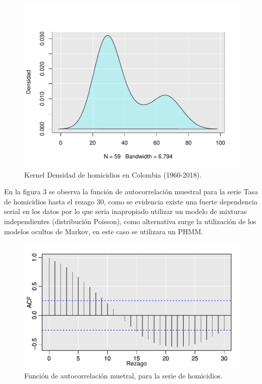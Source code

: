 \documentclass[a4paper]{article}\usepackage[]{graphicx}\usepackage[]{color}
\makeatletter
\def\maxwidth{ %
  \ifdim\Gin@nat@width>\linewidth
    \linewidth
  \else
    \Gin@nat@width
  \fi
}
\newenvironment{knitrout}{}{} %
\makeatother
\begin{document}
\begin{knitrout}
\color{fgcolor}\begin{figure}
\includegraphics[width=\maxwidth]{figure/unnamed-chunk-7-1} \caption[Kernel Densidad de homicidios en Colombia (1960-2018)]{Kernel Densidad de homicidios en Colombia (1960-2018).}\label{fig:unnamed-chunk-7}
\end{figure}


\end{knitrout}

En la figura 3 se observa la función de autocorrelación muestral para la serie Tasa de homicidios hasta el rezago 30, como se evidencia existe una fuerte dependencia serial en los datos por lo que seria inapropiado utilizar un modelo de mixturas independientes (distribución Poisson), como alternativa surge la utilización de los modelos ocultos de Markov, en este caso se utilizara un PHMM.

\begin{knitrout}
\color{fgcolor}\begin{figure}
\includegraphics[width=\maxwidth]{figure/unnamed-chunk-8-1} \caption[Función de autocorrelación muetral, para la serie de homicidios]{Función de autocorrelación muetral, para la serie de homicidios.}\label{fig:unnamed-chunk-8}
\end{figure}


\end{knitrout}
\end{document}
